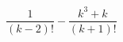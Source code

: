 \begin{ex}[type=expression]
	\begin{condition}
		\( \dfrac{1}{(k-2)!}-\dfrac{k^3+k}{(k+1)!} \)
	\end{condition}
\end{ex}